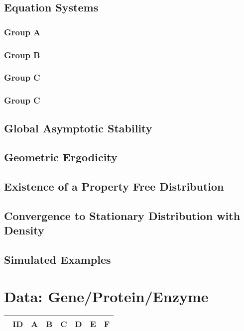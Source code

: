 \documentclass[preprint, 8pt]{elsarticle}
\theoremstyle{definition}
\begin{document}
\subsection{Equation Systems}

\subsubsection{Group A}

\subsubsection{Group B}

\subsubsection{Group C}

\subsubsection{Group C}

\subsection{Global Asymptotic Stability}
\subsection{Geometric Ergodicity}
\subsection{Existence of a Property Free Distribution}
\subsection{Convergence to Stationary Distribution with Density}
\subsection{Simulated Examples}

\section{Data: Gene/Protein/Enzyme}

\begin{table}[H]\centering
\begin{tabular}{p{1cm}p{1cm}p{1cm}p{1cm}p{1cm}p{1cm}p{4cm}}\
ID & A & B & C & D & E & F \\
\hline
\hline
\end{tabular}
\end{table}
\end{document}
